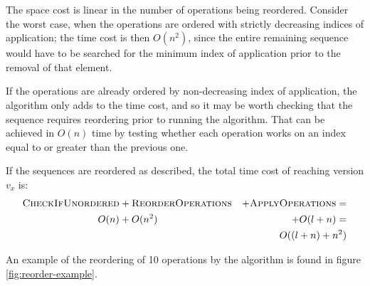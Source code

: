 The space cost is linear in the number of operations being reordered. Consider
the worst case, when the operations are ordered with strictly decreasing indices
of application; the time cost is then $O\left(n^2\right)$, since the entire
remaining sequence would have to be searched for the minimum index of
application prior to the removal of that element.

If the operations are already ordered by non-decreasing index of application,
the algorithm only adds to the time cost, and so it may be worth checking that
the sequence requires reordering prior to running the algorithm. That can be
achieved in $O(n)$ time by testing whether each operation works on an index
equal to or greater than the previous one.

\vbox{ If the sequences are reordered as described, the total time cost of
reaching version $v_x$ is:
\begin{eqnarray*}
\textsc{CheckIfUnordered}&+\textsc{ReorderOperations}&+\textsc{ApplyOperations}=\\
O(n) &+ O(n^2) &+ O(l+n)=\\
&&O((l+n) + n^2)
\end{eqnarray*}
}

An example of the reordering of 10 operations by the algorithm is found in
figure \ref{fig:reorder-example}.

